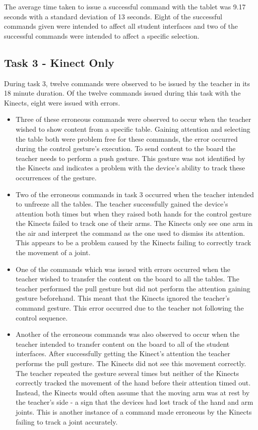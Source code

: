 \documentclass[manuscript, review, screen]{acmart}
\begin{document}
The average time taken to issue a successful command with the tablet was 9.17 seconds with a standard deviation of 13 seconds.
Eight of the successful commands given were intended to affect all student interfaces and two of the successful commands were intended to affect a specific selection.

\subsection{Task 3 - Kinect Only}
\label{sec:results:task3}  

During task 3, twelve commands were observed to be issued by the teacher in its 18 minute duration.
Of the twelve commands issued during this task with the Kinects, eight were issued with errors.

\begin{itemize}
\item Three of these erroneous commands were observed to occur when the teacher wished to show content from a specific table.
Gaining attention and selecting the table both were problem free for these commands, the error occurred during the control gesture's execution.
To send content to the board the teacher needs to perform a push gesture.
This gesture was not identified by the Kinects and indicates a problem with the device's ability to track these occurrences of the gesture.

\item Two of the erroneous commands in task 3 occurred when the teacher intended to unfreeze all the tables.
The teacher successfully gained the device's attention both times but when they raised both hands for the control gesture the Kinects failed to track one of their arms.
The Kinects only see one arm in the air and interpret the command as the one used to dismiss its attention.
This appears to be a problem caused by the Kinects failing to correctly track the movement of a joint.

\item One of the commands which was issued with errors occurred when the teacher wished to transfer the content on the board to all the tables.
The teacher performed the pull gesture but did not perform the attention gaining gesture beforehand.
This meant that the Kinects ignored the teacher's command gesture.
This error occurred due to the teacher not following the control sequence.

\item Another of the erroneous commands was also observed to occur when the teacher intended to transfer content on the board to all of the student interfaces.
After successfully getting the Kinect's attention the teacher performs the pull gesture.
The Kinects did not see this movement correctly.
The teacher repeated the gesture several times but neither of the Kinects correctly tracked the movement of the hand before their attention timed out.
Instead, the Kinects would often assume that the moving arm was at rest by the teacher's side - a sign that the devices had lost track of the hand and arm joints.
This is another instance of a command made erroneous by the Kinects failing to track a joint accurately.


\end{itemize}
\end{document}
